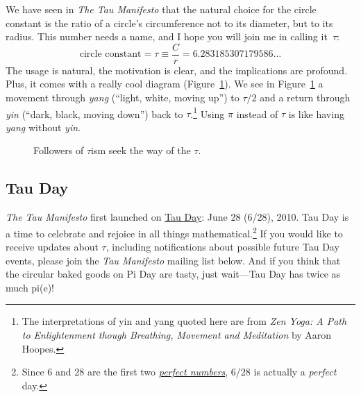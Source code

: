 We have seen in \emph{The Tau Manifesto} that the natural choice for the circle constant is the ratio of a circle's circumference not to its diameter, but to its radius. This number needs a name, and I hope you will join me in calling it~$\tau$:
\[
  \mbox{circle constant} = \tau \equiv \frac{C}{r} = 6.283185307179586\ldots
\]
The usage is natural, the motivation is clear, and the implications are profound. Plus, it comes with a really cool diagram (Figure~\ref{fig:tauism}). We see in Figure~\ref{fig:tauism} a movement through \emph{yang} (``light, white, moving up'') to $\tau/2$ and a return through \emph{yin} (``dark, black, moving down'') back to $\tau$.\footnote{The interpretations of yin and yang quoted here are from \emph{Zen Yoga: A Path to Enlightenment though Breathing, Movement and Meditation} by Aaron Hoopes.} Using $\pi$ instead of $\tau$ is like having \emph{yang} without \emph{yin}.

\begin{figure}
\begin{center}
\end{center}
\caption{Followers of $\tau$ism seek the way of the $\tau$.\label{fig:tauism}}
\end{figure}



  \subsection{Tau Day} %
  \label{sec:tau_day}

\emph{The Tau Manifesto} first launched on \href{http://tauday.com/}{Tau Day}: June 28 (6/28), 2010. Tau Day is a time to celebrate and rejoice in all things mathematical.\footnote{Since 6 and 28 are the first two \href{https://en.wikipedia.org/wiki/Perfect_number}{\emph{perfect numbers}}, 6/28 is actually a \emph{perfect} day.} If you would like to receive updates about $\tau$, including notifications about possible future Tau Day events, please join the \emph{Tau Manifesto} mailing list below. And if you think that the circular baked goods on Pi Day are tasty, just wait---Tau Day has twice as much pi(e)!


